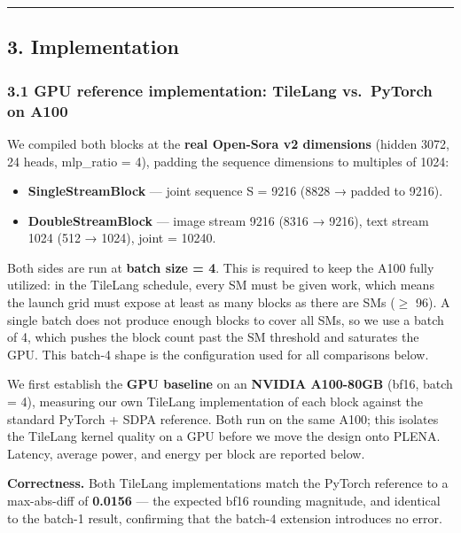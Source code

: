 \documentclass[
  10pt,
]{article}
\providecommand{\tightlist}{%
  \setlength{\itemsep}{0pt}\setlength{\parskip}{0pt}}
\begin{document}
\begin{center}\rule{0.5\linewidth}{0.5pt}\end{center}

\subsection{3. Implementation}\label{implementation}

\subsubsection{3.1 GPU reference implementation: TileLang vs.~PyTorch on
A100}\label{gpu-baseline-tilelang-vs.-pytorch-on-a100}

We compiled both blocks at the \textbf{real Open-Sora v2 dimensions}
(hidden 3072, 24 heads, mlp\_ratio = 4), padding the sequence dimensions
to multiples of 1024:

\begin{itemize}
\tightlist
\item
  \textbf{SingleStreamBlock} --- joint sequence S = 9216 (8828 → padded
  to 9216).
\item
  \textbf{DoubleStreamBlock} --- image stream 9216 (8316 → 9216), text
  stream 1024 (512 → 1024), joint = 10240.
\end{itemize}

Both sides are run at \textbf{batch size = 4}. This is required to keep
the A100 fully utilized: in the TileLang schedule, every SM must be
given work, which means the launch grid must expose at least as many
blocks as there are SMs (\(\geq\) 96). A single batch does not produce enough
blocks to cover all SMs, so we use a batch of 4, which pushes the block
count past the SM threshold and saturates the GPU. This batch-4 shape is
the configuration used for all comparisons below.

We first establish the \textbf{GPU baseline} on an \textbf{NVIDIA
A100-80GB} (bf16, batch = 4), measuring our own TileLang implementation
of each block against the standard PyTorch + SDPA reference. Both run on
the same A100; this isolates the TileLang kernel quality on a GPU before
we move the design onto PLENA. Latency, average power, and energy per
block are reported below.

\textbf{Correctness.} Both TileLang implementations match the PyTorch
reference to a max-abs-diff of \textbf{0.0156} --- the expected bf16
rounding magnitude, and identical to the batch-1 result, confirming that
the batch-4 extension introduces no error.
\end{document}
